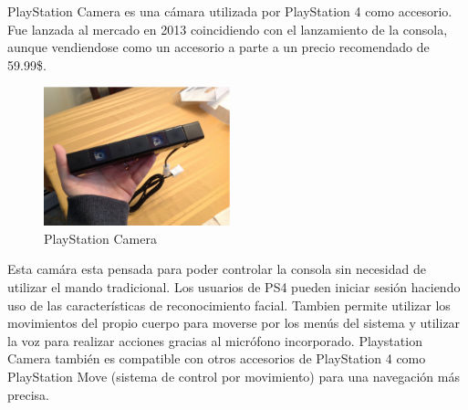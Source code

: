 


PlayStation Camera es una cámara utilizada por PlayStation 4 como accesorio. Fue
lanzada al mercado en 2013 coincidiendo con el lanzamiento de la consola, aunque
vendiendose como un accesorio a parte a un precio recomendado de 59.99\$.

\begin{figure}
  \vspace{-20pt}
  \begin{center}
    \includegraphics[width=0.48\textwidth]{images/cap3/PlaystationCamera.eps}
  \end{center}
  \vspace{-20pt}
  \caption{PlayStation Camera}
  \vspace{-10pt}
  \label{fig:PlayStation-Camera}
\end{figure}

Esta camára esta pensada para poder controlar la consola sin necesidad de
utilizar el mando tradicional. Los usuarios de PS4 pueden iniciar sesión
haciendo uso de las características de reconocimiento facial. Tambien permite
utilizar los movimientos del propio cuerpo para moverse por los menús del
sistema y utilizar la voz para realizar acciones gracias al micrófono
incorporado. Playstation Camera también es compatible con otros accesorios de
PlayStation 4 como PlayStation Move (sistema de control por movimiento) para una
navegación más precisa.

